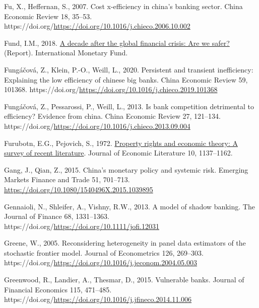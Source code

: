 \documentclass[
  12pt,
  a4paper,
  DIV=11,
  numbers=noendperiod]{scrreprt}
\newlength{\cslhangindent}
\newenvironment{CSLReferences}[2] %
 {\begin{list}{}{%
  \setlength{\itemindent}{0pt}
  \setlength{\leftmargin}{0pt}
  \setlength{\parsep}{0pt}
  \ifodd #1
   \setlength{\leftmargin}{\cslhangindent}
   \setlength{\itemindent}{-1\cslhangindent}
  \fi
  \setlength{\itemsep}{#2\baselineskip}}}
 {\end{list}}
\begin{document}
\begin{CSLReferences}{1}{0}
Fu, X., Heffernan, S., 2007. Cost x-efficiency in china's banking
sector. China Economic Review 18, 35--53.
https://doi.org/\url{https://doi.org/10.1016/j.chieco.2006.10.002}

Fund, I.M., 2018.
\href{https://www.imf.org/en/Publications/GFSR/Issues/2018/09/25/Global-Financial-Stability-Report-October-2018\#:~:text=Chapter\%201\%3A\%20A\%20Decade\%20after,economies\%20and\%20escalating\%20trade\%20tensions.}{A
decade after the global financial crisis: Are we safer?} (Report).
International Monetary Fund.

Fungáčová, Z., Klein, P.-O., Weill, L., 2020. Persistent and transient
inefficiency: Explaining the low efficiency of chinese big banks. China
Economic Review 59, 101368.
https://doi.org/\url{https://doi.org/10.1016/j.chieco.2019.101368}

Fungáčová, Z., Pessarossi, P., Weill, L., 2013. Is bank competition
detrimental to efficiency? Evidence from china. China Economic Review
27, 121--134.
https://doi.org/\url{https://doi.org/10.1016/j.chieco.2013.09.004}

Furubotn, E.G., Pejovich, S., 1972.
\href{http://www.jstor.org/stable/2721541}{Property rights and economic
theory: A survey of recent literature}. Journal of Economic Literature
10, 1137--1162.

Gang, J., Qian, Z., 2015. China's monetary policy and systemic risk.
Emerging Markets Finance and Trade 51, 701--713.
\url{https://doi.org/10.1080/1540496X.2015.1039895}

Gennaioli, N., Shleifer, A., Vishny, R.W., 2013. A model of shadow
banking. The Journal of Finance 68, 1331--1363.
https://doi.org/\url{https://doi.org/10.1111/jofi.12031}

Greene, W., 2005. Reconsidering heterogeneity in panel data estimators
of the stochastic frontier model. Journal of Econometrics 126, 269--303.
https://doi.org/\url{https://doi.org/10.1016/j.jeconom.2004.05.003}

Greenwood, R., Landier, A., Thesmar, D., 2015. Vulnerable banks. Journal
of Financial Economics 115, 471--485.
https://doi.org/\url{https://doi.org/10.1016/j.jfineco.2014.11.006}


\end{CSLReferences}
\end{document}
